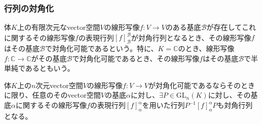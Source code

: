 \documentclass[dvipdfmx]{jsarticle}
\begin{document}
\subsubsection{行列の対角化}%
\begin{dfn}
体$K$上の有限次元なvector空間$V$の線形写像$f:V \rightarrow V$のある基底$\mathcal{B}$が存在してこれに関するその線形写像$f$の表現行列$[ f]_{\mathcal{B}}^{\mathcal{B}}$が対角行列となるとき、その線形写像$f$はその基底$\mathcal{B}$で対角化可能であるという。特に、$K = \mathbb{C}$のとき、線形写像$f:\mathbb{C} \rightarrow \mathbb{C}$がその基底$\mathcal{B}$で対角化可能であるとき、その線形写像$f$はその基底$\mathcal{B}$で半単純であるともいう。
\end{dfn}
\begin{thm}\label{2.2.2.11}
体$K$上の$n$次元vector空間$V$の線形写像$f:V \rightarrow V$が対角化可能であるならそのときに限り、任意のそのvector空間$V$の基底$\alpha$に対し、$\exists P \in {\mathrm{GL} }_{n}(K)$に対し、その基底$\alpha$に関するその線形写像$f$の表現行列$[ f]_{\alpha}^{\alpha}$を用いた行列$P^{- 1}[ f]_{\alpha}^{\alpha}P$も対角行列となる。
\end{thm}
\end{document}
